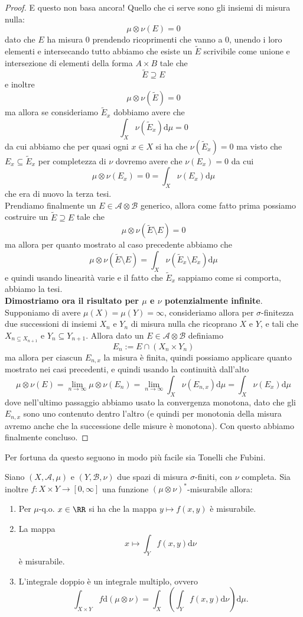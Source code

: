 \documentclass[11pt]{scrartcl}
\newcommand{\dif}{\text{d}}
\begin{document}
\begin{proof}
		E questo non basa ancora! Quello che ci serve sono gli insiemi di misura nulla:
		$$\mu\otimes \nu (E)=0$$
		dato che $E$ ha misura $0$ prendendo ricoprimenti che vanno a $0$, unendo i loro elementi e intersecando tutto abbiamo che esiste un $\tilde{E}$ scrivibile come unione e intersezione di elementi della forma $A\times B$ tale che 
		$$\tilde{E}\supseteq E$$
		e inoltre 
		$$\mu \otimes \nu (\tilde{E})=0$$ 
		ma allora se consideriamo $\tilde{E}_x$ dobbiamo avere che 
		$$\int_X \nu(\tilde{E}_x)\dif \mu =0$$
		da cui abbiamo che per quasi ogni $x\in X$ si ha che $\nu\left(\tilde{E}_x\right)=0$ ma visto che $E_x\subseteq \tilde{E}_x$ per completezza di $\nu$ dovremo avere che $\nu(E_x)=0$ da cui 
		$$\mu\otimes \nu (E_x)=0=\int_X \nu(E_x)\dif \mu$$
		che era di nuovo la terza tesi. \\
		Prendiamo finalmente un $E\in \mathcal{A}\otimes \mathcal{B}$ generico, allora come fatto prima possiamo costruire un $\tilde{E}\supseteq E$ tale che
		$$\mu\otimes \nu \left(\tilde{E}\setminus E\right)=0$$
		ma allora per quanto mostrato al caso precedente abbiamo che
		$$\mu\otimes \nu\left(\tilde{E}\setminus E\right)=\int_X \nu(\tilde{E}_x\setminus E_x)\dif \mu$$ 
		e quindi usando linearità varie e il fatto che $\tilde{E}_x$ sappiamo come si comporta, abbiamo la tesi. \\
		\textbf{Dimostriamo ora il risultato per $\mu$ e $\nu$ potenzialmente infinite}. Supponiamo di avere $\mu(X)=\mu(Y)=\infty$, consideriamo allora per $\sigma$-finitezza due successioni di insiemi $X_n$ e $Y_n$ di misura nulla che ricoprano $X$ e $Y$, e tali che $X_{n\subseteq X_{n+1}}$ e $Y_n\subseteq Y_{n+1}$. Allora dato un $E\in \mathcal{A}\otimes \mathcal{B}$ definiamo
		$$E_n:=E\cap \left(X_n\times Y_n\right)$$ 
		ma allora per ciascun $E_{n,x}$ la misura è finita, quindi possiamo applicare quanto mostrato nei casi precedenti, e quindi usando la continuità dall'alto
		$$\mu\otimes \nu (E)= \lim_{n\to\infty}\mu\otimes \nu (E_n)=\lim_{n\to\infty}\int_X \nu(E_{n,x})\dif \mu = \int_X\nu (E_x)\dif \mu$$
		dove nell'ultimo passaggio abbiamo usato la convergenza monotona, dato che gli $E_{n,x}$ sono uno contenuto dentro l'altro (e quindi per monotonia della misura avremo anche che la successione delle misure è monotona). Con questo abbiamo finalmente concluso.
	\end{proof}
	Per fortuna da questo seguono in modo più facile sia Tonelli che Fubini.
	\begin{theorem}[Tonelli]
		Siano $(X,\mathcal{A},\mu)$ e $(Y,\mathcal{B},\nu)$ due spazi di misura $\sigma$-finiti, con $\nu$ completa. Sia inoltre $f:X\times Y\to [0,\infty]$ una funzione $\left(\mu \otimes \nu\right)^*$-misurabile allora:
		\begin{enumerate}
			\item Per $\mu$-q.o. $x\in \RR$ si ha che la mappa $y\mapsto f(x,y)$ è misurabile.
			\item La mappa 
			$$x\mapsto \int_Y f(x,y)\dif \nu $$
			è misurabile.
			\item L'integrale doppio è un integrale multiplo, ovvero
			$$\int_{X\times Y} f\dif \left(\mu \otimes \nu\right)=\int_X\left(\int_Y f(x,y)\dif \nu\right)\dif \mu.$$
		\end{enumerate} 
	\end{theorem}
\end{document}

